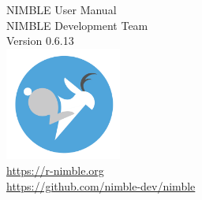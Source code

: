 \thispagestyle{empty}
\begin{center}
{\huge NIMBLE User Manual}\\ 
\vspace{0.2in}
{\large NIMBLE Development Team}\\
\vspace{0.2in}
{\large Version 0.6.13}\\
\vspace{3in}
\includegraphics[width=1.5in]{../nimble-icon.png}\\
{\large
\href{https://r-nimble.org}{https://r-nimble.org}\\
\href{https://github.com/nimble-dev/nimble}{https://github.com/nimble-dev/nimble}
}
\end{center}

